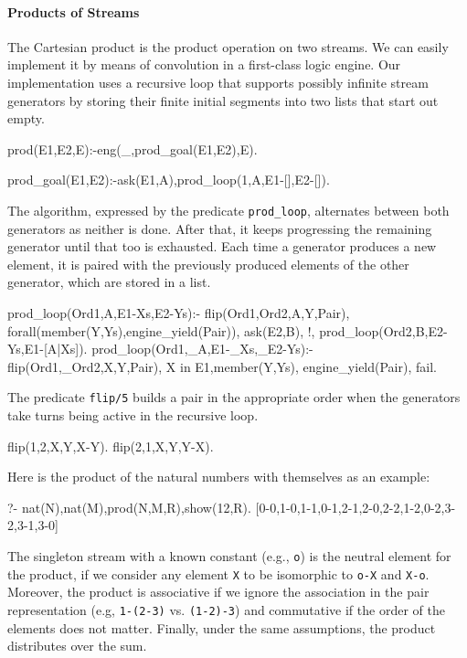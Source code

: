 \documentclass{new_tlp}
\begin{document}
\paragraph{Products of Streams}

The Cartesian product is the product operation on two streams. We can
easily implement it by means of convolution in a first-class logic engine.
Our implementation uses a recursive loop that supports possibly infinite stream
generators by storing their finite initial segments into two lists that start
out empty.
\begin{code}
prod(E1,E2,E):-eng(_,prod_goal(E1,E2),E).

prod_goal(E1,E2):-ask(E1,A),prod_loop(1,A,E1-[],E2-[]).
\end{code}

The algorithm, expressed by the predicate {\tt prod\_loop},
alternates between both generators as neither is done.
After that, it keeps progressing the remaining generator until 
that too is exhausted. Each time a generator produces a new element,
it is paired with the previously produced elements of the other generator,
which are stored in a list.
\begin{code}
prod_loop(Ord1,A,E1-Xs,E2-Ys):-
  flip(Ord1,Ord2,A,Y,Pair),
  forall(member(Y,Ys),engine_yield(Pair)),
  ask(E2,B),
  !,
  prod_loop(Ord2,B,E2-Ys,E1-[A|Xs]).
prod_loop(Ord1,_A,E1-_Xs,_E2-Ys):-
  flip(Ord1,_Ord2,X,Y,Pair),
  X in E1,member(Y,Ys),
  engine_yield(Pair),
  fail.
\end{code}

The predicate {\tt flip/5} builds a pair in the appropriate order
when the generators take turns being active in the recursive loop.
\begin{code} 
flip(1,2,X,Y,X-Y).
flip(2,1,X,Y,Y-X).
\end{code}
Here is the product of the natural numbers with themselves as an example:
\begin{codex}
?- nat(N),nat(M),prod(N,M,R),show(12,R).
[0-0,1-0,1-1,0-1,2-1,2-0,2-2,1-2,0-2,3-2,3-1,3-0]
\end{codex}

The singleton stream with a known constant (e.g., {\tt o}) is the neutral
element for the product, if we consider any element {\tt X} to be isomorphic to
{\tt o-X} and {\tt X-o}.  Moreover, the product is associative if we ignore the
association in the pair representation (e.g, {\tt 1-(2-3)} vs. {\tt (1-2)-3})
and commutative if the order of the elements does not matter.  Finally, under the same
assumptions, the product distributes over the sum.
\end{document}
